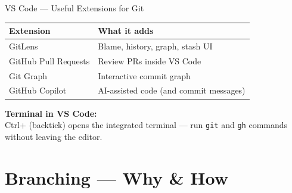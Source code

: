 \documentclass[aspectratio=169, 11pt]{beamer}
\begin{document}
\begin{frame}{VS Code --- Useful Extensions for Git}
  \begin{table}
    \centering
    \begin{tabular}{@{} l l @{}}
      \toprule
      \textbf{Extension} & \textbf{What it adds} \\
      \midrule
      GitLens              & Blame, history, graph, stash UI \\
      GitHub Pull Requests & Review PRs inside VS Code \\
      Git Graph            & Interactive commit graph \\
      GitHub Copilot       & AI-assisted code (and commit messages) \\
      \bottomrule
    \end{tabular}
  \end{table}

  \vspace{0.5em}
  \textbf{Terminal in VS Code:}\\
  Ctrl+\textasciigrave{} (backtick) opens the integrated terminal --- run \texttt{git} and \texttt{gh} commands without leaving the editor.
\end{frame}

\section{Branching --- Why \& How}
\end{document}
